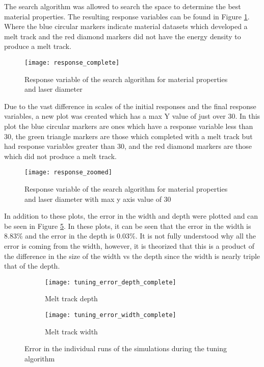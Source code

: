 \label{results}

The search algorithm was allowed to search the space to determine the best material properties.  The resulting response variables can be found in Figure \ref{fig:response_complete}.  Where the blue circular markers indicate material datasets which developed a melt track and the red diamond markers did not have the energy density to produce a melt track.
\begin{figure}[!htb]
	\centering
	\texttt{[image: response\_complete]}
	\caption{Response variable of the search algorithm for material properties and laser diameter}
	\label{fig:response_complete}
\end{figure}
Due to the vast difference in scales of the initial responses and the final response variables, a new plot was created which has a max Y value of just over 30.  In this plot the blue circular markers are ones which have a response variable less than 30, the green triangle markers are those which completed with a melt track but had response variables greater than 30, and the red diamond markers are those which did not produce a melt track.
\begin{figure}[!htb]
	\centering
	\texttt{[image: response\_zoomed]}
	\caption{Response variable of the search algorithm for material properties and laser diameter with max y axis value of 30}
	\label{fig:response_zoomed}
\end{figure}
In addition to these plots, the error in the width and depth were plotted and can be seen in Figure \ref{fig:tuning_error_complete}.  In these plots, it can be seen that the error in the width is 8.83\% and the error in the depth is 0.03\%.  It is not fully understood why all the error is coming from the width, however, it is theorized that this is a product of the difference in the size of the width vs the depth since the width is nearly triple that of the depth.
\begin{figure}[!htb]\centering
	\begin{subfigure}[c]{0.475\textwidth}\centering
	\texttt{[image: tuning\_error\_depth\_complete]}
	\caption{Melt track depth}
	\label{fig:tuning_error_depth_complete}
	\end{subfigure}\hfill{}
		\begin{subfigure}[c]{0.475\textwidth}\centering
		\texttt{[image: tuning\_error\_width\_complete]}
		\caption{Melt track width}
		\label{fig:tuning_error_width_complete}
		\end{subfigure}
	\caption{Error in the individual runs of the simulations during the tuning algorithm}
	\label{fig:tuning_error_complete}
\end{figure}

